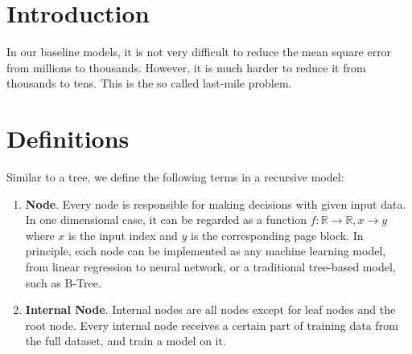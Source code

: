 \section{Introduction}


In our baseline models, it is not very difficult to reduce the mean square error from millions to thousands. However, it is much harder to reduce it from thousands to tens. This is the so called last-mile problem.
\section{Definitions}

Similar to a tree, we define the following terms in a recursive model:

\begin{enumerate}
	\item \textbf{Node}. Every node is responsible for making decisions with given input data. In one dimensional case, it can be regarded as a function $f:\mathbb{R}\to\mathbb{R}, x\to y$ where $x$ is the input index and $y$ is the corresponding page block. In principle, each node can be implemented as any machine learning model, from linear regression to neural network, or a traditional tree-based model, such as B-Tree.
	\item \textbf{Internal Node}. Internal nodes are all nodes except for leaf nodes and the root node. Every internal node receives a certain part of training data from the full dataset, and train a model on it. 
\end{enumerate}